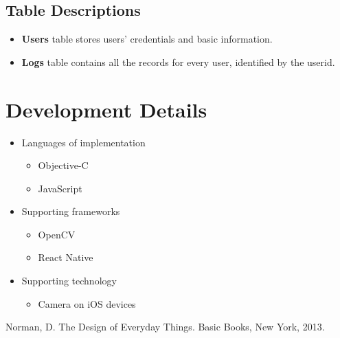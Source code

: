 \documentclass{article}
\begin{document}
\subsection{Table Descriptions}
\begin{itemize}
    \item \textbf{Users} table stores users' credentials and basic information.
    \item \textbf{Logs} table contains all the records for every user, identified by the userid.
\end{itemize}

\section{Development Details}
\begin{itemize}
    \item Languages of implementation
    \begin{itemize}
        \item Objective-C
        \item JavaScript
    \end{itemize}
    \item Supporting frameworks
    \begin{itemize}
        \item OpenCV
        \item React Native
    \end{itemize}
    \item Supporting technology
    \begin{itemize}
        \item Camera on iOS devices
    \end{itemize}
\end{itemize}


\begin{thebibliography}{9}
Norman, D. The Design of Everyday Things. Basic
Books, New York, 2013.
\end{thebibliography}


\end{document}
